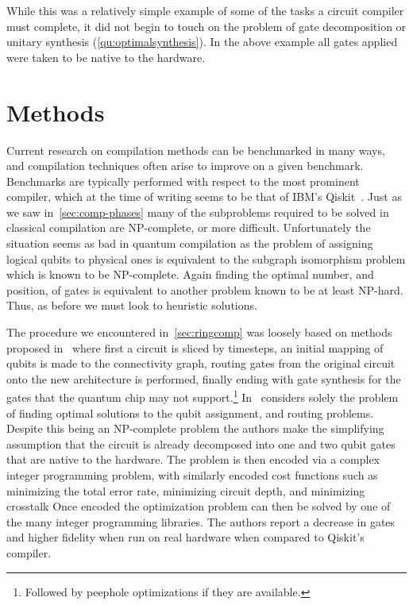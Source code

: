 While this was a relatively simple example of some of the tasks a circuit compiler must complete, it did not begin to touch on the problem of gate decomposition or unitary synthesis (\cref{qu:optimalsynthesis}). %
In the above example all gates applied were taken to be native to the hardware.


\section{Methods}\label{sec:methods}

Current research on compilation methods can be benchmarked in many ways, and compilation techniques often arise to improve on a given benchmark.
Benchmarks are typically performed with respect to the most prominent compiler, which at the time of writing seems to be that of IBM's Qiskit~\cite{qiskit}.
Just as we saw in~\cref{sec:comp-phases} many of the subproblems required to be solved in classical compilation are NP-complete, or more difficult.
Unfortunately the situation seems as bad in quantum compilation as the problem of assigning logical qubits to physical ones is equivalent to the subgraph isomorphism problem which is known to be NP-complete.
Again finding the optimal number, and position, of \SWAP{} gates is equivalent to another problem known to be at least NP-hard.
Thus, as before we must look to heuristic solutions.

The procedure we encountered in~\cref{sec:ringcomp} was loosely based on methods proposed in~\cite{ring-compilation} where first a circuit is sliced by timesteps, an initial mapping of qubits is made to the connectivity graph, routing gates from the original circuit onto the new architecture is performed, finally ending with gate synthesis for the gates that the quantum chip may not support.\footnote{Followed by peephole optimizations if they are available.}
In~\cite{intprog} considers solely the problem of finding optimal solutions to the qubit assignment, and routing problems.
Despite this being an NP-complete problem the authors make the simplifying assumption that the circuit is already decomposed into one and two qubit gates that are native to the hardware.
The problem is then encoded via a complex integer programming problem, with similarly encoded cost functions such as minimizing the total error rate, minimizing circuit depth, and minimizing crosstalk
Once encoded the optimization problem can then be solved by one of the many integer programming libraries.
The authors report a decrease in \CNOT{} gates and higher fidelity when run on real hardware when compared to Qiskit's compiler.

